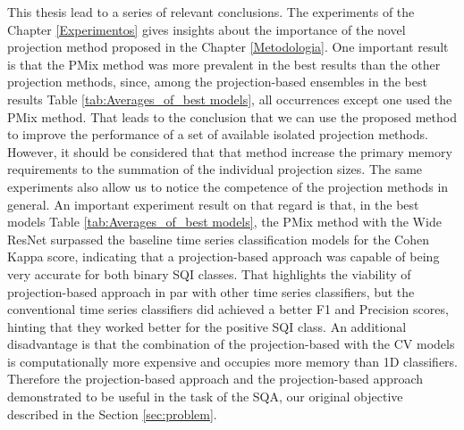 
This thesis lead to a series of relevant conclusions. The experiments of the Chapter \ref{Experimentos} gives insights about the importance of the novel projection method proposed in the Chapter \ref{Metodologia}. One important result is that the \gls{PMix} method was more prevalent in the best results than the other projection methods, since, among the projection-based ensembles in the best results Table \ref{tab:Averages_of_best models}, all occurrences except one used the \gls{PMix} method. That leads to the conclusion that we can use the proposed method to improve the performance of a set of available isolated projection methods. However, it should be considered that that method increase the primary memory requirements to the summation of the individual projection sizes. The same experiments also allow us to notice the competence of the projection methods in general. An important experiment result on that regard is that, in the best models Table \ref{tab:Averages_of_best models}, the \gls{PMix} method with the Wide ResNet surpassed the baseline time series classification models for the Cohen Kappa score, indicating that a projection-based approach was capable of being very accurate for both binary \gls{SQI} classes. That highlights the viability of projection-based approach in par with other time series classifiers, but the conventional time series classifiers did achieved a better F1 and Precision scores, hinting that they worked better for the positive \gls{SQI} class. An additional disadvantage is that the combination of the projection-based with the \gls{CV} models is computationally more expensive and occupies more memory than 1D classifiers. Therefore the projection-based approach and the projection-based approach demonstrated to be useful in the task of the \gls{SQA}, our original objective described in the Section \ref{sec:problem}.

